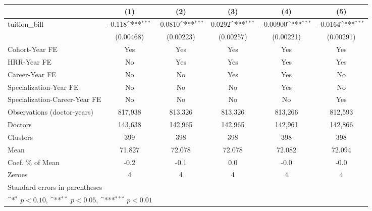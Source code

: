 {
\def\sym#1{\ifmmode^{#1}\else\(^{#1}\)\fi}
\begin{tabular}{l*{5}{c}}
\hline\hline
                    &\multicolumn{1}{c}{(1)}         &\multicolumn{1}{c}{(2)}         &\multicolumn{1}{c}{(3)}         &\multicolumn{1}{c}{(4)}         &\multicolumn{1}{c}{(5)}         \\
\hline
tuition\_bill        &      -0.118\sym{***}&     -0.0810\sym{***}&      0.0292\sym{***}&    -0.00900\sym{***}&     -0.0164\sym{***}\\
                    &   (0.00468)         &   (0.00223)         &   (0.00257)         &   (0.00221)         &   (0.00291)         \\
[1em]
Cohort-Year FE      &         Yes         &         Yes         &         Yes         &         Yes         &         Yes         \\
[1em]
HRR-Year FE         &          No         &         Yes         &         Yes         &         Yes         &         Yes         \\
[1em]
Career-Year FE      &          No         &          No         &         Yes         &         Yes         &          No         \\
[1em]
Specialization-Year FE&          No         &          No         &          No         &         Yes         &          No         \\
[1em]
Specialization-Career-Year FE&          No         &          No         &          No         &          No         &         Yes         \\
\hline
Observations (doctor-years)&     817,938         &     813,326         &     813,326         &     813,266         &     812,593         \\
Doctors             &     143,638         &     142,965         &     142,965         &     142,961         &     142,866         \\
Clusters            &         399         &         398         &         398         &         398         &         398         \\
Mean                &      71.827         &      72.078         &      72.078         &      72.082         &      72.094         \\
Coef. \% of Mean    &        -0.2         &        -0.1         &         0.0         &        -0.0         &        -0.0         \\
Zeroes              &           4         &           4         &           4         &           4         &           4         \\
\hline\hline
\multicolumn{6}{l}{\footnotesize Standard errors in parentheses}\\
\multicolumn{6}{l}{\footnotesize \sym{*} \(p<0.10\), \sym{**} \(p<0.05\), \sym{***} \(p<0.01\)}\\
\end{tabular}
}
